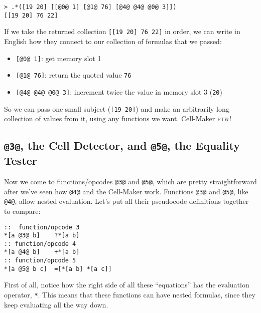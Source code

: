 \documentclass[twoside]{article}
\begin{document}
\begin{lstlisting}[style=listingcode]
> .*([19 20] [[@0@ 1] [@1@ 76] [@4@ @4@ @0@ 3]])
[[19 20] 76 22]
\end{lstlisting}

If we take the returned collection \lstinline[style=inlinecode]{[[19 20] 76 22]} in order, we can write in English how they connect to our collection of formulas that we passed:

\begin{itemize}
  \item  \lstinline[style=inlinecode]{[@0@ 1]}: get memory slot 1
  \item  \lstinline[style=inlinecode]{[@1@ 76]}: return the quoted value \lstinline[style=inlinecode]{76}
  \item  \lstinline[style=inlinecode]{[@4@ @4@ @0@ 3]}: increment twice the value in memory slot 3 (\lstinline[style=inlinecode]{20})
\end{itemize}

So we can pass one small subject (\lstinline[style=inlinecode]{[19 20]}) and make an arbitrarily long collection of values from it, using any functions we want. Cell-Maker \textsc{ftw}!

\subsection{\lstinline[style=inlinecode]{@3@}, the Cell Detector, and \lstinline[style=inlinecode]{@5@}, the Equality Tester}

Now we come to functions/opcodes \lstinline[style=inlinecode]{@3@} and \lstinline[style=inlinecode]{@5@}, which are pretty straightforward after we've seen how \lstinline[style=inlinecode]{@4@} and the Cell-Maker work. Functions \lstinline[style=inlinecode]{@3@} and \lstinline[style=inlinecode]{@5@}, like \lstinline[style=inlinecode]{@4@}, allow nested evaluation. Let's put all their pseudocode definitions together to compare:

\begin{lstlisting}[style=listingcode]
::  function/opcode 3
*[a @3@ b]    ?*[a b]
:: function/opcode 4
*[a @4@ b]    +*[a b]
:: function/opcode 5
*[a @5@ b c]  =[*[a b] *[a c]]
\end{lstlisting}

First of all, notice how the right side of all these “equations” has the evaluation operator, \lstinline[style=inlinecode]{*}. This means that these functions can have nested formulas, since they keep evaluating all the way down.
\end{document}
